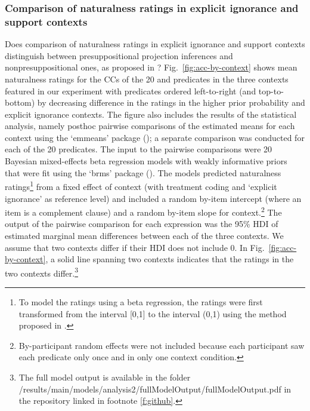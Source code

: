 \documentclass[11pt,fleqn]{article}
\newcommand{\6}{\mbox{$[\hspace*{-.6mm}[$}}
\newcommand{\9}{\mbox{$]\hspace*{-.6mm}]$}}
\begin{document}
\subsubsection{Comparison of naturalness ratings in explicit ignorance and support contexts}\label{s:analysis2}

Does comparison of naturalness ratings in explicit ignorance and support contexts distinguish between presuppositional projection inferences and nonpresuppositional ones, as proposed in \citealt{mandelkern-etal2020}? Fig.~\ref{fig:acc-by-context} shows mean naturalness ratings for the CCs of the 20  and  predicates in the three contexts featured in our experiment with predicates ordered left-to-right (and top-to-bottom) by decreasing difference in the ratings in the higher prior probability and explicit ignorance contexts. The figure also includes the results of the statistical analysis, namely posthoc pairwise comparisons of the estimated means for each context using the `emmeans' package (\citealt{emmeans}); a separate comparison was conducted for each of the 20 predicates. The input to the pairwise comparisons were 20 Bayesian mixed-effects beta regression models with weakly informative priors that were fit using the `brms' package (\citealt{buerkner2017}). The models predicted  naturalness ratings\footnote{\label{fn:transform}To model the ratings using a beta regression, the ratings were first transformed from the interval [0,1] to the interval (0,1) using the method proposed in \citealt{smithson-verkuilen2006}.} from a fixed effect of context (with treatment coding and `explicit ignorance' as reference level) and included a random by-item intercept (where an item is a complement clause) and a random by-item slope for context.\footnote{By-participant random effects were not included because each participant saw each predicate only once and in only one context condition.} The output of the pairwise comparison for each expression was the 95\% HDI of estimated marginal mean differences between each of the three contexts. We assume that two contexts differ if their HDI does not include 0. In Fig.~\ref{fig:acc-by-context}, a solid line spanning two contexts indicates that the ratings in the two contexts differ.\footnote{The full model output is available in the folder /results/main/models/analysis2/fullModelOutput/fullModelOutput.pdf in the repository linked in footnote \ref{f:github}.}
\end{document}
